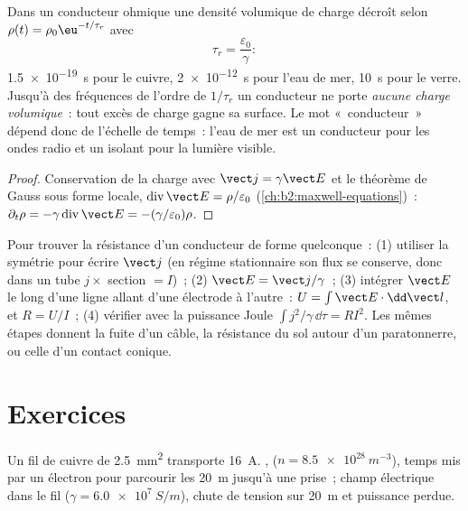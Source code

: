 \begin{proposition}\label{prop:b2:charges-currents-conduction:relaxation}
Dans un conducteur ohmique une densité volumique de charge décroît selon $\rho(t) =
\rho_0\eu^{-t/\tau_r}$ avec
\[
\tau_r = \frac{\varepsilon_0}{\gamma} :
\]
\qty{1.5e-19}{s} pour le cuivre, \qty{2e-12}{s} pour l'eau de mer, \qty{10}{s} pour le verre.
Jusqu'à des fréquences de l'ordre de $1/\tau_r$ un conducteur ne porte \emph{aucune
charge volumique}~: tout excès de charge gagne sa surface. Le mot
«~conducteur~» dépend donc de l'échelle de temps~: l'eau de mer est un conducteur
pour les ondes radio et un isolant pour la lumière visible.
\end{proposition}

\begin{proof}
Conservation de la charge avec $\vect j = \gamma\vect E$ et le théorème de Gauss sous forme
locale, $\operatorname{div}\vect E = \rho/\varepsilon_0$ (\cref{ch:b2:maxwell-equations})~:
$\partial_t\rho = -\gamma\operatorname{div}\vect E = -(\gamma/\varepsilon_0)\rho$.
\end{proof}

\begin{method}\label{met:b2:charges-currents-conduction:method}
Pour trouver la résistance d'un conducteur de forme quelconque~: (1) utiliser la
symétrie pour écrire $\vect j$ (en régime stationnaire son flux se conserve, donc dans un
tube $j \times$ section $= I$)~; (2) $\vect E = \vect j/\gamma$~; (3) intégrer
$\vect E$ le long d'une ligne allant d'une électrode à l'autre~: $U = \int\vect E\cdot
\dd\vect l$, et $R = U/I$~; (4) vérifier avec la puissance Joule $\int j^2/\gamma\,
\dd\tau = RI^2$. Les mêmes étapes donnent la fuite d'un câble, la résistance
du sol autour d'un paratonnerre, ou celle d'un contact conique.
\end{method}

\section{Exercices}

\begin{exercise}[$\star$]\label{exo:b2:charges-currents-conduction:1}
Un fil de cuivre de \qty{2.5}{mm^2} transporte \qty{16}{A}. ,  ($n = \qty{8.5e28}{m^{-3}}$), temps mis par un électron pour parcourir les
\qty{20}{m} jusqu'à une prise~; champ électrique dans le fil ($\gamma = \qty{6.0e7}{S/m}$),
chute de tension sur \qty{20}{m} et puissance perdue.
\end{exercise}

